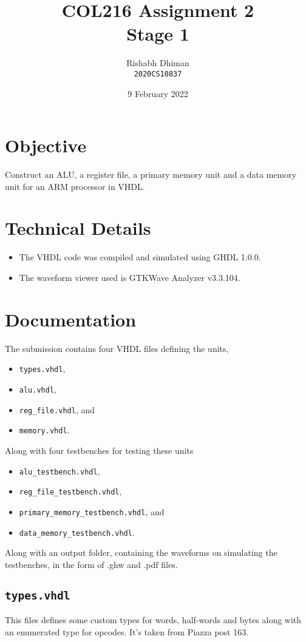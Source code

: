 \documentclass[a4paper]{scrartcl}
\title{COL216 Assignment 2\\{\Large Stage 1}}
\date{9 February 2022}
\author{Rishabh Dhiman\\ \texttt{2020CS10837}}
\theoremstyle{definition}
\renewcommand{\tt}{\texttt}
\begin{document}
\maketitle

\section{Objective}
Construct an ALU, a register file, a primary memory unit and a data memory unit for an ARM processor in VHDL.

\section{Technical Details}
\begin{itemize}
	\item The VHDL code was compiled and simulated using GHDL 1.0.0.
	\item The waveform viewer used is GTKWave Analyzer v3.3.104.
\end{itemize}

\section{Documentation}
The submission contains four VHDL files defining the units,
\begin{itemize}
	\item \tt{types.vhdl},
	\item \tt{alu.vhdl},
	\item \tt{reg_file.vhdl}, and
	\item \tt{memory.vhdl}.
\end{itemize}
Along with four testbenches for testing these units
\begin{itemize}
	\item \tt{alu_testbench.vhdl},
	\item \tt{reg_file_testbench.vhdl},
	\item \tt{primary_memory_testbench.vhdl}, and
	\item \tt{data_memory_testbench.vhdl}.
\end{itemize}

Along with an output folder, containing the waveforms on simulating the testbenches, in the form of .ghw and .pdf files.

\subsection*{\tt{types.vhdl}}
This files defines some custom types for words, half-words and bytes along with an enumerated type for opcodes. It's taken from Piazza post 163.
\end{document}
